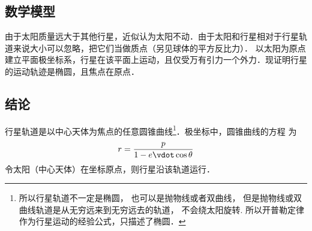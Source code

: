 

\subsection{数学模型}
由于太阳质量远大于其他行星，近似认为太阳不动．由于太阳和行星相对于行星轨道来说大小可以忽略，把它们当做质点（另见球体的平方反比力）．%
以太阳为原点建立平面极坐标系，行星在该平面上运动，且仅受万有引力一个外力．现证明行星的运动轨迹是椭圆，且焦点在原点．

\subsection{结论}
行星轨道是以中心天体为焦点的任意圆锥曲线\footnote{所以行星轨道不一定是椭圆， 也可以是抛物线或者双曲线， 但是抛物线或双曲线轨道是从无穷远来到无穷远去的轨道， 不会绕太阳旋转. 所以开普勒定律作为行星运动的经验公式，只描述了椭圆．}．极坐标中，圆锥曲线的方程
为
\begin{equation}\label{Keple1_eq1}
r = \frac{p}{{1 - e \vdot \cos \theta }}
\end{equation}
令太阳（中心天体）在坐标原点，则行星沿该轨道运行．



